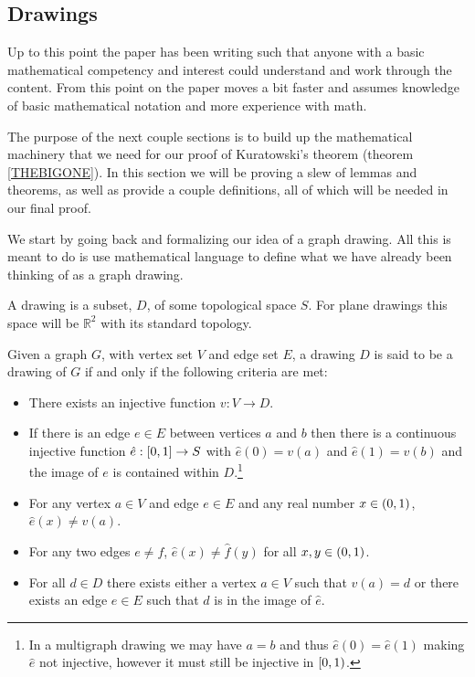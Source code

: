 \documentclass{article}
\begin{document}
\subsection{Drawings}
Up to this point the paper has been writing such that anyone with a basic mathematical competency and interest could understand and work through the content. From this point on the paper moves a bit faster and assumes knowledge of basic mathematical notation and more experience with math.

The purpose of the next couple sections is to build up the mathematical machinery that we need for our proof of Kuratowski's theorem (theorem \ref{THEBIGONE}). In this section we will be proving a slew of lemmas and theorems, as well as provide a couple definitions, all of which will be needed in our final proof.

We start by going back and formalizing our idea of a graph drawing. All this is meant to do is use mathematical language to define what we have already been thinking of as a graph drawing.

\begin{definition}[Drawing]
	A drawing is a subset, $D$, of some topological space $S$. For plane drawings this space will be $\mathbb R^2$ with its standard topology.
\end{definition}

\begin{definition}
Given a graph $G$, with vertex set $V$ and edge set $E$, a drawing $D$ is said to be a drawing of $G$ if and only if the following criteria are met:
\begin{itemize}
	\item There exists an injective function $v:V\to D$.
	\item If there is an edge $e\in E$ between vertices $a$ and $b$ then there is a continuous injective function $\hat e:\left[ {0} , {1} \right]\to S$ with $\hat e(0) = v(a)$ and $\hat e(1) = v(b)$ and the image of $e$ is contained within $D$.\footnote{In a multigraph drawing we may have $a=b$ and thus $\hat e(0) = \hat e(1)$ making $\hat e$ not injective, however it must still be injective in $\left[ {0} , {1} \right)$.}
	\item For any vertex $a\in V$ and edge $e\in E$ and any real number $x\in\left( {0} , {1} \right)$, $\hat e(x)\not=v(a)$.
	\item For any two edges $e\not=f$, $\hat e(x) \not= \hat f(y)$ for all $x,y \in\left( {0} , {1} \right)$.
	\item For all $d\in D$ there exists either a vertex $a\in V$ such that $v(a) = d$ or there exists an edge $e\in E$ such that $d$ is in the image of $\hat e$.
\end{itemize}
\end{definition}
\end{document}

